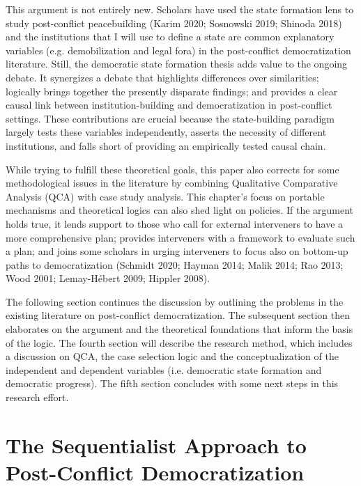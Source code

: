 \documentclass [11pt]{article}
\begin{document}
This argument is not entirely new. Scholars have used the state formation lens to study post-conflict peacebuilding (Karim 2020; Sosnowski 2019; Shinoda 2018) and the institutions that I will use to define a state are common explanatory variables (e.g. demobilization and legal fora) in the post-conflict democratization literature. Still, the democratic state formation thesis adds value to the ongoing debate. It synergizes a debate that highlights differences over similarities; logically brings together the presently disparate findings; and provides a clear causal link between institution-building and democratization in post-conflict settings. These contributions are crucial because the state-building paradigm largely tests these variables independently, asserts the necessity of different institutions, and falls short of providing an empirically tested causal chain.

While trying to fulfill these theoretical goals, this paper also corrects for some methodological issues in the literature by combining Qualitative Comparative Analysis (QCA) with case study analysis. This chapter's focus on portable mechanisms and theoretical logics can also shed light on policies. If the argument holds true, it lends support to those who call for external interveners to have a more comprehensive plan; provides interveners with a framework to evaluate such a plan; and joins some scholars in urging interveners to focus also on bottom-up paths to democratization (Schmidt 2020; Hayman 2014; Malik 2014; Rao 2013; Wood 2001; Lemay-Hébert 2009; Hippler 2008).

The following section continues the discussion by outlining the problems in the existing literature on post-conflict democratization. The subsequent section then elaborates on the argument and the theoretical foundations that inform the basis of the logic. The fourth section will describe the research method, which includes a discussion on QCA, the case selection logic and the conceptualization of the independent and dependent variables (i.e. democratic state formation and democratic progress). The fifth section concludes with some next steps in this research effort.


\section*{The Sequentialist Approach to Post-Conflict Democratization}
\end{document}
